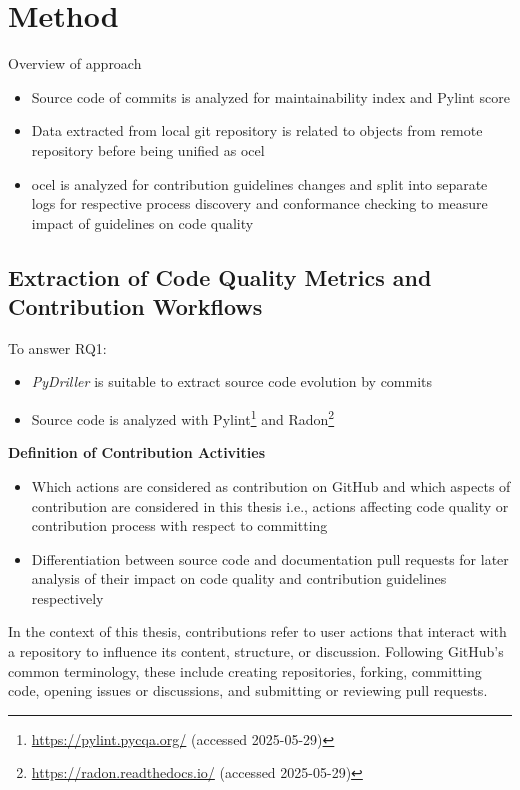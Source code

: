 \chapter{Method}
\label{chap:method}
Overview of approach
\begin{itemize}
	\item Source code of commits is analyzed for maintainability index and Pylint score
	\item Data extracted from local git repository is related to objects from remote repository before being unified as \ac{ocel}
	\item \ac{ocel} is analyzed for contribution guidelines changes and split into separate logs for respective process discovery and conformance checking to measure impact of guidelines on code quality
\end{itemize}

\section{Extraction of Code Quality Metrics and Contribution Workflows}
To answer RQ1:
\begin{itemize}

	\item \emph{PyDriller} is suitable to extract source code evolution by commits
	\item Source code is analyzed with Pylint\footnote{\url{https://pylint.pycqa.org/} (accessed 2025-05-29)} and Radon\footnote{\url{https://radon.readthedocs.io/} (accessed 2025-05-29)}
\end{itemize}


\textbf{Definition of Contribution Activities}
\begin{itemize}
	\item Which actions are considered as contribution on GitHub and which aspects of contribution are considered in this thesis i.e., actions affecting code quality or contribution process with respect to committing
	\item Differentiation between source code and documentation pull requests for later analysis of their impact on code quality and contribution guidelines respectively
\end{itemize}

In the context of this thesis, contributions refer to user actions that interact with a repository to influence its content, structure, or discussion. Following GitHub's common terminology, these include creating repositories, forking, committing code, opening issues or discussions, and submitting or reviewing pull requests.

